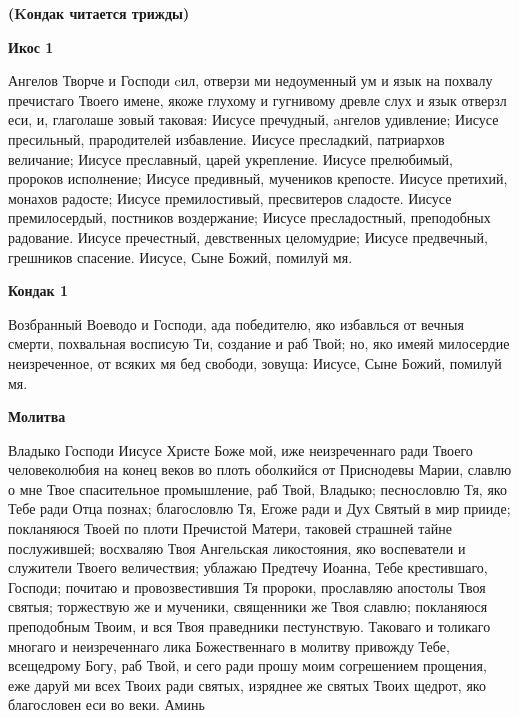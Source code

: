 \medskip
\bfseries (Kондак читается трижды)\normalfont{}\nopagebreak


\medskip
\bfseries Икос 1\normalfont{}\nopagebreak


Ангелов
Творче и Господи cил, отверзи ми недоуменный ум и язык на похвалу пречистаго Твоего имене, якоже глухому и гугнивому древле слух и язык отверзл еси, и, глаголаше зовый таковая: Иисусе пречудный, aнгелов удивление; Иисусе пресильный, прародителей избавление. Иисусе пресладкий, патриархов величание; Иисусе преславный, царей укрепление. Иисусе прелюбимый, пророков исполнение; Иисусе предивный, мучеников крепосте. Иисусе претихий, монахов радосте; Иисусе премилостивый, пресвитеров сладосте. Иисусе премилосердый, постников воздержание; Иисусе пресладостный, преподобных радование. Иисусе пречестный, девственных целомудрие; Иисусе предвечный, грешников спасение. Иисусе, Сыне Божий, помилуй мя.


\medskip
\bfseries Кондак 1\normalfont{}\nopagebreak


Возбранный
Воеводо и Господи, ада победителю, яко избавлься от вечныя смерти, похвальная восписую Ти, создание и раб Твой; но, яко имеяй милосердие неизреченное, от всяких мя бед свободи, зовуща: Иисусе, Сыне Божий, помилуй мя.


\medskip
\bfseries Молитва\normalfont{}\nopagebreak


Владыко
Господи Иисусе Христе Боже мой, иже неизреченнаго ради Твоего человеколюбия на конец веков во плоть оболкийся от Приснодевы Марии, славлю о мне Твое спасительное промышление, раб Твой, Владыко;
песнословлю Тя, яко Тебе ради Отца познах; благословлю Тя, Егоже ради и Дух Святый в мир прииде; покланяюся Твоей по плоти Пречистой Матери, таковей страшней тайне послужившей; восхваляю Твоя Ангельская ликостояния, яко воспеватели и служители Твоего величествия; ублажаю Предтечу Иоанна, Тебе крестившаго, Господи; почитаю и провозвестившия Тя пророки, прославляю апостолы Твоя святыя; торжествую же и мученики, священники же Твоя славлю; покланяюся преподобным Твоим, и вся Твоя праведники пестунствую. Таковаго и толикаго многаго и неизреченнаго лика Божественнаго в молитву привожду Тебе, всещедрому Богу, раб Твой, и сего ради прошу моим согрешением прощения, еже даруй ми всех Твоих ради святых, изряднее же святых Твоих щедрот, яко благословен еси во веки. Аминь\mychapterending

 

